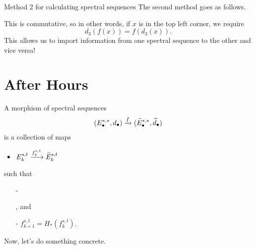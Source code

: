 \begin{remark}{Method 2 for calculating spectral sequences}{}
    The second method goes as follows. 
    \begin{center}
    \end{center}
    This is commutative, so in other words, if $x$ is in the top left corner, we require $$d_3(f(x)) = f(d_3(x)).$$ This allows us to import information from one spectral sequence to the other and vice versa!
\end{remark}

\newpage
\section{After Hours}
\begin{definition}{}{}
    A morphism of spectral sequences $$(E_\bullet^{\ast,\ast},d_\bullet)\xrightarrow{f}(\widetilde{E}_\bullet^{\ast,\ast},\widetilde{d}_\bullet)$$ is a collection of maps
    \begin{itemize}
        \item $E_k^{s,t}\xrightarrow{f_k^{s,t}}\widetilde{E}_k^{s,t}$
    \end{itemize}
    such that 
    \begin{multicols}{2}
        \begin{itemize}
            \item[-]   , and \columnbreak
            \item[-] $f_{k+1}^{s,t} = H_\ast(f_k^{s,t})$.
        \end{itemize}
    \end{multicols}
\end{definition}
Now, let's do something concrete. 

